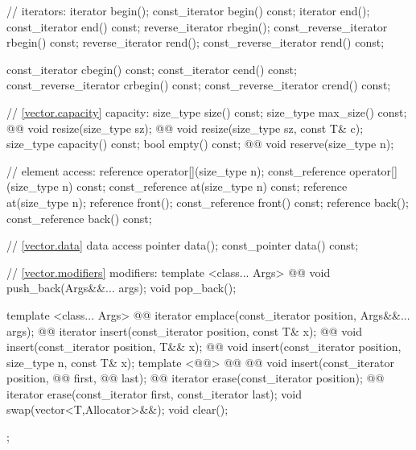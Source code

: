 \documentclass[american,twoside]{book}
\begin{document}
\begin{codeblock}
{{    // iterators:
    iterator               begin();
    const_iterator         begin() const;
    iterator               end();
    const_iterator         end() const;
    reverse_iterator       rbegin();
    const_reverse_iterator rbegin() const;
    reverse_iterator       rend();
    const_reverse_iterator rend() const;

    const_iterator         cbegin() const;
    const_iterator         cend() const;
    const_reverse_iterator crbegin() const;
    const_reverse_iterator crend() const;

    // \ref{vector.capacity} capacity:
    size_type size() const;
    size_type max_size() const;
    @@ void resize(size_type sz);
    @@ void resize(size_type sz, const T& c);
    size_type capacity() const;
    bool      empty() const;
    @@ void reserve(size_type n);

    // element access:
    reference       operator[](size_type n);
    const_reference operator[](size_type n) const;
    const_reference at(size_type n) const;
    reference       at(size_type n);
    reference       front();
    const_reference front() const;
    reference       back();
    const_reference back() const;

    // \ref{vector.data} data access
    pointer         data();
    const_pointer   data() const;

    // \ref{vector.modifiers} modifiers:
    template <class... Args> 
      @@
      void push_back(Args&&... args);
    void pop_back();

    template <class... Args> 
      @@
      iterator emplace(const_iterator position, Args&&... args);
    @@ 
      iterator insert(const_iterator position, const T& x);
    @@
      void insert(const_iterator position, T&& x);
    @@
      void insert(const_iterator position, size_type n, const T& x);
    template <@@>
        @@
              @@
        void insert(const_iterator position,
                    @@ first, @@ last);
    @@ iterator erase(const_iterator position);
    @@ iterator erase(const_iterator first, const_iterator last);
    void     swap(vector<T,Allocator>&&);
    void     clear();
  };

}
\end{codeblock}
\end{document}
